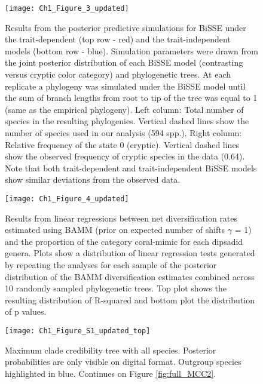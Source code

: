 \begin{figure}[h]
	\centering
	\texttt{[image: Ch1\_Figure\_3\_updated]}
	\caption[Results from the posterior predictive simulations for BiSSE under the trait-dependent and the trait-independent models.]{Results from the posterior predictive simulations for BiSSE under the trait-dependent (top row - red) and the trait-independent models (bottom row - blue). Simulation parameters were drawn from the joint posterior distribution of each BiSSE model (contrasting versus cryptic color category) and phylogenetic trees. At each replicate a phylogeny was simulated under the BiSSE model until the sum of branch lengths from root to tip of the tree was equal to 1 (same as the empirical phylogeny). Left column: Total number of species in the resulting phylogenies. Vertical dashed lines show the number of species used in our analysis (594 spp.). Right column: Relative frequency of the state 0 (cryptic). Vertical dashed lines show the observed frequency of cryptic species in the data (0.64). Note that both trait-dependent and trait-independent BiSSE models show similar deviations from the observed data.}
	\label{fig:predic_BiSSE} %
\end{figure}

\begin{figure}[h]
	\centering
	\texttt{[image: Ch1\_Figure\_4\_updated]}
	\caption[Results from linear regressions between net diversification rates estimated using BAMM and the proportion of the category coral-mimic for each dipsadid genera.]{Results from linear regressions between net diversification rates estimated using BAMM (prior on expected number of shifts $\gamma$ = 1) and the proportion of the category coral-mimic for each dipsadid genera. Plots show a distribution of linear regression tests generated by repeating the analyses for each sample of the posterior distribution of the BAMM diversification estimates combined across 10 randomly sampled phylogenetic trees. Top plot shows the resulting distribution of R-squared and bottom plot the distribution of p values.}
	\label{fig:linear_BAMM} %
\end{figure}

\begin{figure}[h]
	\centering
	\texttt{[image: Ch1\_Figure\_S1\_updated\_top]}
	\caption[Maximum clade credibility tree with all species (Part 1).]{Maximum clade credibility tree with all species. Posterior probabilities are only visible on digital format. Outgroup species highlighted in blue. Continues on Figure \ref{fig:full_MCC2}.}
	\label{fig:full_MCC1} %
\end{figure}

